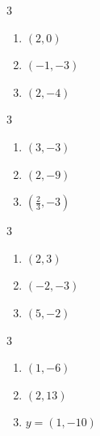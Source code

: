 \documentclass{ximera}
\begin{document}
	\author{Stitz-Zeager}



\label{AnswersforTransformations}


\begin{multicols}{3}
\begin{enumerate}

\item $(2,0)$
\item $(-1,-3)$
\item $(2,-4)$

\setcounter{HW}{\value{enumi}}
\end{enumerate}
\end{multicols}

\begin{multicols}{3}
\begin{enumerate}
\setcounter{enumi}{\value{HW}}

\item $(3,-3)$
\item $(2,-9)$
\item $\left(\frac{2}{3}, -3\right)$

\setcounter{HW}{\value{enumi}}
\end{enumerate}
\end{multicols}

\begin{multicols}{3}
\begin{enumerate}
\setcounter{enumi}{\value{HW}}

\item $(2,3)$
\item $(-2,-3)$
\item $(5,-2)$

\setcounter{HW}{\value{enumi}}
\end{enumerate}
\end{multicols}

\begin{multicols}{3}
\begin{enumerate}
\setcounter{enumi}{\value{HW}}

\item $(1,-6)$
\item $(2,13)$
\item $y = (1,-10)$

\setcounter{HW}{\value{enumi}}
\end{enumerate}
\end{multicols}
\end{document}
